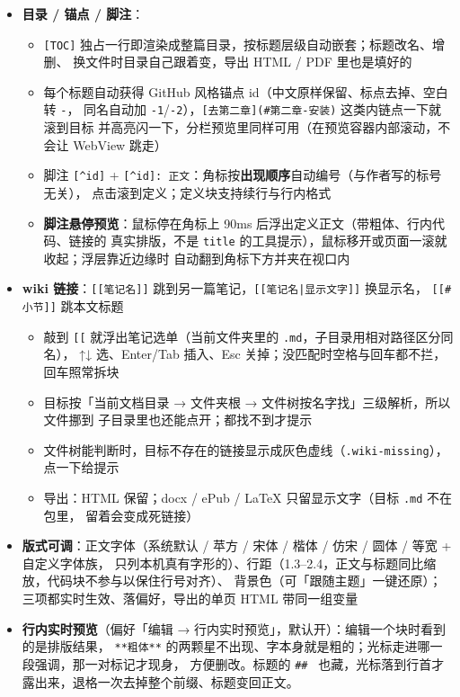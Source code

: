 \documentclass[11pt,a4paper]{ctexart}
\begin{document}
\begin{itemize}
\item \textbf{目录 / 锚点 / 脚注}：
\begin{itemize}
\item \texttt{[TOC]} 独占一行即渲染成整篇目录，按标题层级自动嵌套；标题改名、增删、
换文件时目录自己跟着变，导出 HTML / PDF 里也是填好的
\item 每个标题自动获得 GitHub 风格锚点 id（中文原样保留、标点去掉、空白转 \texttt{-}，
同名自动加 \texttt{-1}/\texttt{-2}），\texttt{[去第二章](\#第二章-安装)} 这类内链点一下就滚到目标
并高亮闪一下，分栏预览里同样可用（在预览容器内部滚动，不会让 WebView 跳走）
\item 脚注 \texttt{[\textasciicircum{}id]} + \texttt{[\textasciicircum{}id]: 正文}：角标按\textbf{出现顺序}自动编号（与作者写的标号无关），
点击滚到定义；定义块支持续行与行内格式
\item \textbf{脚注悬停预览}：鼠标停在角标上 90ms 后浮出定义正文（带粗体、行内代码、链接的
真实排版，不是 \texttt{title} 的工具提示），鼠标移开或页面一滚就收起；浮层靠近边缘时
自动翻到角标下方并夹在视口内
\end{itemize}
\item \textbf{wiki 链接}：\texttt{[[笔记名]]} 跳到另一篇笔记，\texttt{[[笔记名|显示文字]]} 换显示名，
\texttt{[[\#小节]]} 跳本文标题
\begin{itemize}
\item 敲到 \texttt{[[} 就浮出笔记选单（当前文件夹里的 \texttt{.md}，子目录用相对路径区分同名），
↑↓ 选、Enter/Tab 插入、Esc 关掉；没匹配时空格与回车都不拦，回车照常拆块
\item 目标按「当前文档目录 → 文件夹根 → 文件树按名字找」三级解析，所以文件挪到
子目录里也还能点开；都找不到才提示
\item 文件树能判断时，目标不存在的链接显示成灰色虚线（\texttt{.wiki-missing}），点一下给提示
\item 导出：HTML 保留；docx / ePub / LaTeX 只留显示文字（目标 \texttt{.md} 不在包里，
留着会变成死链接）
\end{itemize}
\item \textbf{版式可调}：正文字体（系统默认 / 苹方 / 宋体 / 楷体 / 仿宋 / 圆体 / 等宽 + 自定义字体族，
只列本机真有字形的）、行距（1.3–2.4，正文与标题同比缩放，代码块不参与以保住行号对齐）、
背景色（可「跟随主题」一键还原）；三项都实时生效、落偏好，导出的单页 HTML 带同一组变量
\item \textbf{行内实时预览}（偏好「编辑 → 行内实时预览」，默认开）：编辑一个块时看到的是排版结果，
\texttt{**粗体**} 的两颗星不出现、字本身就是粗的；光标走进哪一段强调，那一对标记才现身，
方便删改。标题的 \texttt{\#\# } 也藏，光标落到行首才露出来，退格一次去掉整个前缀、标题变回正文。

\end{itemize}
\end{document}
